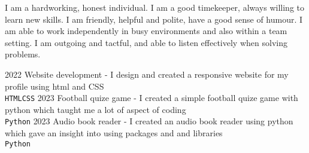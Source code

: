 \documentclass[9pt]{developercv} %
\begin{document}
\vspace{0.5cm}



\begin{minipage}[t]{0.4\textwidth} %
	\vspace{-\baselineskip} %
	
	{I am a hardworking, honest individual. I am a good timekeeper, always willing to learn new skills. I am friendly, helpful and polite, have a good sense of humour. I am able to work independently in busy environments and also within a team setting. I am outgoing and tactful, and able to listen effectively when solving problems.}
\end{minipage}
\hfill %
\begin{minipage}[t]{0.5\textwidth} %
	\vspace{-\baselineskip} %
	\begin{barchart}{5.5}
	\end{barchart}
\end{minipage}

\begin{center}
    {\small {}}
\end{center}




\begin{entrylist}
	\entry
		{2022}
		{Website development}
	-
		{{I design and created a responsive website for my profile using html and CSS}\\ \texttt{HTML}\slashsep\texttt{CSS}}
        \entry
            {2023}
		{Football quize game}
	-
            {{I created a simple football quize game with python which taught me a lot of aspect of coding }\\ \texttt{Python}}
        \entry
            {2023}
            {Audio book reader}
        -
            {{I created an audio book reader using python which gave an insight into using packages and and libraries}\\ \texttt{Python}}

\end{entrylist}
\end{document}
